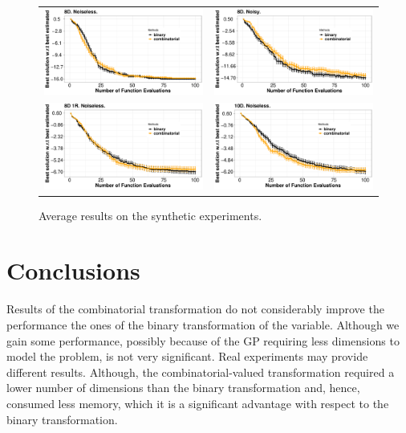 \begin{figure}[htb]
\begin{tabular}{cc}
        \includegraphics[width=0.475\linewidth]{Figures/combinatorial/8V.pdf} &
        \includegraphics[width=0.475\linewidth]{Figures/combinatorial/8V_noisy.pdf} \\
        \includegraphics[width=0.475\linewidth]{Figures/combinatorial/8V1R.pdf} &
        \includegraphics[width=0.475\linewidth]{Figures/combinatorial/10V.pdf} \\
\end{tabular}
\caption{{\small Average results on the synthetic experiments.}}
\label{fig:results_synthetic_combinatorial}
\end{figure}
\section{Conclusions}
Results of the combinatorial transformation do not considerably improve the performance the ones of the binary transformation of the variable. Although we gain some performance, possibly because of the GP requiring less dimensions to model the problem, is not very significant. Real experiments may provide different results. Although, the combinatorial-valued transformation required a lower number of dimensions than the binary transformation and, hence, consumed less memory, which it is a significant advantage with respect to the binary transformation.
